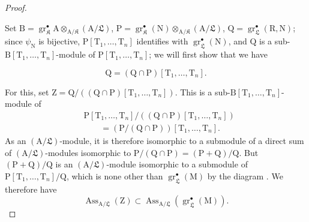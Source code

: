 \begin{proof}
\begin{env}[19.7.1.2]
\label{IV.19.7.1.2}
Set $\mathrm{B}=\operatorname{gr}_\mathfrak K^\bullet\mathrm{A}\otimes_{\mathrm{A}/\mathfrak K}(\mathrm{A}/\mathfrak{L})$, $\mathrm{P}=\operatorname{gr}_\mathfrak K^\bullet(\mathrm{N})\otimes_{\mathrm{A}/\mathfrak K}(\mathrm{A}/\mathfrak{L})$, $\mathrm{Q}=\operatorname{gr}_\mathfrak{L}^\bullet(\mathrm{R},\mathrm{N})$; since $\psi_\mathrm{N}$ is bijective, $\mathrm{P}[\mathrm{T}_1,\ldots,\mathrm{T}_n]$ identifies with $\operatorname{gr}_\mathfrak{L}^\bullet(\mathrm{N})$, and $\mathrm{Q}$ is a sub-$\mathrm{B}[\mathrm{T}_1,\ldots,\mathrm{T}_n]$-module of $\mathrm{P}[\mathrm{T}_1,\ldots,\mathrm{T}_n]$; we will first show that we have
\end{env}
\begin{env}[19.7.1.3]
\label{IV.19.7.1.3}
\[
  \mathrm{Q}=(\mathrm{Q}\cap\mathrm{P})[\mathrm{T}_1,\ldots,\mathrm{T}_n].
\]
\end{env}

For this, set $\mathrm{Z}=\mathrm{Q}/((\mathrm{Q}\cap\mathrm{P})[\mathrm{T}_1,\ldots,\mathrm{T}_n])$.
This is a sub-$\mathrm{B}[\mathrm{T}_1,\ldots,\mathrm{T}_n]$-module of
\[
  \begin{aligned}
  &\mathrm{P}[\mathrm{T}_1,\ldots,\mathrm{T}_n]
  /((\mathrm{Q}\cap\mathrm{P})[\mathrm{T}_1,\ldots,\mathrm{T}_n])\\
  &\qquad=(\mathrm{P}/(\mathrm{Q}\cap\mathrm{P}))[\mathrm{T}_1,\ldots,\mathrm{T}_n].
  \end{aligned}
\]
As an $(\mathrm{A}/\mathfrak{L})$-module, it is therefore isomorphic to a submodule of a direct sum of $(\mathrm{A}/\mathfrak{L})$-modules isomorphic to $\mathrm{P}/(\mathrm{Q}\cap\mathrm{P})=(\mathrm{P}+\mathrm{Q})/\mathrm{Q}$.
But $(\mathrm{P}+\mathrm{Q})/\mathrm{Q}$ is an $(\mathrm{A}/\mathfrak{L})$-module isomorphic to a submodule of $\mathrm{P}[\mathrm{T}_1,\ldots,\mathrm{T}_n]/\mathrm{Q}$, which is none other than $\operatorname{gr}_\mathfrak{L}^\bullet(\mathrm{M})$ by the diagram .
We therefore have
\begin{equation}
  \operatorname{Ass}_{\mathrm{A}/\mathfrak{L}}(\mathrm{Z})\subset\operatorname{Ass}_{\mathrm{A}/\mathfrak{L}}(\operatorname{gr}_\mathfrak{L}^\bullet(\mathrm{M})).
  \tag{19.7.1.4}\label{IV.19.7.1.4}
\end{equation}


\end{proof}
